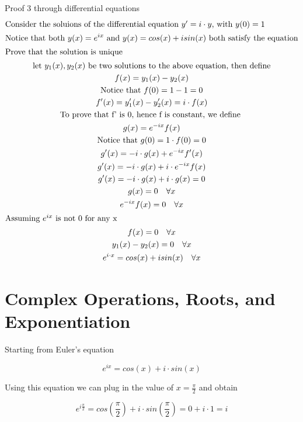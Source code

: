 \documentclass[a4paper]{article}
\begin{document}
\begin{theorem}
Proof 3 through differential equations
\begin{gather*}
\intertext{Consider the soluions of the differential equation $y' = i \cdot y$, with $y(0) = 1$}
\text{Notice that both } y(x) = e^{ix} \text{ and } y(x) = cos(x) + i sin(x) \text{  both satisfy the equation}
\\
\intertext{Prove that the solution is unique}
\text{let $y_1(x), y_2(x)$ be two solutions to the above equation, then define}
\\
f(x) = y_1(x) - y_2(x)
\\
\text{Notice that } f(0) = 1 - 1 = 0
\\
f'(x) = y'_1(x) - y'_2(x) = i \cdot f(x)
\\
\text{To prove that f' is 0, hence f is constant, we define }
\\
g(x) = e^{-ix} f(x)
\\
\text{Notice that } g(0) = 1 \cdot f(0) = 0
\\
g'(x) = -i \cdot g(x) + e^{-ix} f'(x)
\\
g'(x) = -i \cdot g(x) + i \cdot e^{-ix}  f(x)
\\
g'(x) = -i \cdot g(x) + i \cdot g(x) = 0
\\
g(x) = 0 \quad \forall x
\\
e^{-ix} f(x)  = 0 \quad \forall x
\\
\intertext{Assuming $e^{ix}$ is not 0 for any x}
f(x) = 0 \quad \forall x
\\
y_1(x) - y_2(x) = 0 \quad \forall x
\\
e^{i \cdot x} = cos(x) + i sin(x)  \quad \forall x
\end{gather*}

\end{theorem}

\section{Complex Operations, Roots, and Exponentiation}\label{uii:sec:properties}
Starting from Euler's equation
\begin{definition}
$$e^{ix} = cos(x) + i \cdot sin(x)$$
\end{definition}

Using this equation we can plug in the value of $x = \frac{\pi}{2}$ and obtain

\begin{equation}
e^{i\frac{\pi}{2}} = cos(\frac{\pi}{2}) + i \cdot sin(\frac{\pi}{2}) = 0 + i \cdot 1 = i
\end{equation}
\end{document}

